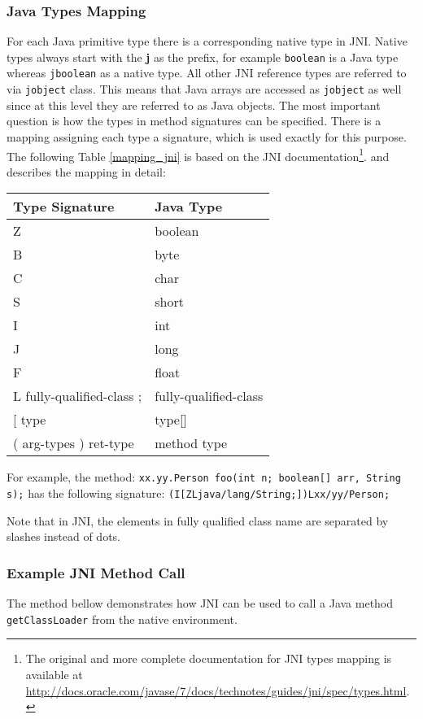 \subsubsection{Java Types Mapping}
For each Java primitive type there is a corresponding native type in JNI. Native types always start with the \textbf{j} as the prefix, for example \texttt{boolean} is a Java type whereas \texttt{jboolean} as a native type.
All other JNI reference types are referred to via \texttt{jobject} class. This means that Java arrays are accessed as \texttt{jobject} as well since at this level they are referred to as Java objects. The most important question is how the types in method signatures can be specified. There is a mapping assigning each type a signature, which is used exactly for this purpose. The following Table \ref{mapping_jni} is based on the JNI documentation\footnote{The original and more complete documentation for JNI types mapping is available at \url{http://docs.oracle.com/javase/7/docs/technotes/guides/jni/spec/types.html}.}. and describes the mapping in detail:
\begin{center}
\begin{tabular}{ l l }
	  \hline
	  Type Signature & Java Type \\ \hline
	Z & boolean \\
	B & byte \\
	C & char \\
	S & short \\
	I & int \\
	J & long \\
	F & float \\
	L fully-qualified-class ; & fully-qualified-class \\
	{[} type & type{[]}\ \\
	( arg-types ) ret-type & method type \\
\end{tabular}
\label{mapping_jni}
\end{center}

For example, the method: \newline \texttt{xx.yy.Person foo(int n; boolean[] arr, String s);} has the following signature:
\texttt{(I[ZLjava/lang/String;])Lxx/yy/Person;}

Note that in JNI, the elements in fully qualified class name are separated by slashes instead of dots.
\subsubsection{Example JNI Method Call}
The method bellow demonstrates how JNI can be used to call a Java method \texttt{getClassLoader} from the native environment.

